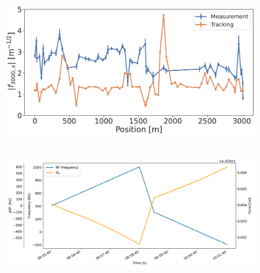 \begin{figure}[!htb]
    \centering
    \includegraphics[width=0.8\linewidth]{images/kek/f3000x_LER.pdf}
    \caption{}
    \label{fig:kek:rdt_f3000x_LER}
\end{figure}



\FloatBarrier
\subsection{}

\begin{figure}[!htb]
    \centering
    \includegraphics[width=\linewidth]{images/kek/rf_qx.png}
    \caption{}
    \label{fig:kek:chroma_procedure}
\end{figure}


